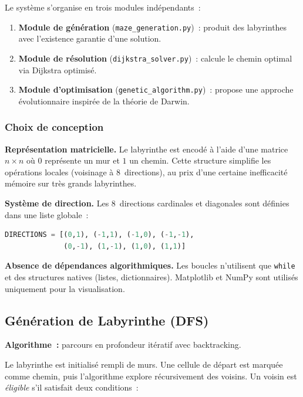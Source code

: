 \documentclass[12pt, a4paper]{article}
\theoremstyle{definition}
\theoremstyle{remark}
\newcommand{\code}[1]{\texttt{#1}}
\begin{document}
Le système s'organise en trois modules indépendants~:

\begin{enumerate}[leftmargin=*, label=\arabic*.]
    \item \textbf{Module de génération} (\code{maze\_generation.py})~: produit des
          labyrinthes avec l'existence garantie d'une solution.
    \item \textbf{Module de résolution} (\code{dijkstra\_solver.py})~: calcule le
          chemin optimal via Dijkstra optimisé.
    \item \textbf{Module d'optimisation} (\code{genetic\_algorithm.py})~: propose
          une approche évolutionnaire inspirée de la théorie de Darwin.
\end{enumerate}

\subsubsection*{Choix de conception}

\textbf{Représentation matricielle.}
Le labyrinthe est encodé à l'aide d'une matrice $n \times n$ où $0$ représente un mur
et $1$ un chemin. Cette structure simplifie les opérations locales (voisinage à
8~directions), au prix d'une certaine inefficacité mémoire sur très grands labyrinthes.

\textbf{Système de direction.}
Les 8~directions cardinales et diagonales sont définies dans une liste globale~:

\begin{lstlisting}[language=Python]
DIRECTIONS = [(0,1), (-1,1), (-1,0), (-1,-1),
              (0,-1), (1,-1), (1,0), (1,1)]
\end{lstlisting}

\textbf{Absence de dépendances algorithmiques.}
Les boucles n'utilisent que \code{while} et des structures natives (listes,
dictionnaires). Matplotlib et NumPy sont utilisés uniquement pour la visualisation.

\subsection{Génération de Labyrinthe (DFS)}

\textbf{Algorithme~:} parcours en profondeur itératif avec backtracking.

Le labyrinthe est initialisé rempli de murs. Une cellule de départ est marquée comme
chemin, puis l'algorithme explore récursivement des voisins. Un voisin est
\emph{éligible} s'il satisfait deux conditions~:
\end{document}
